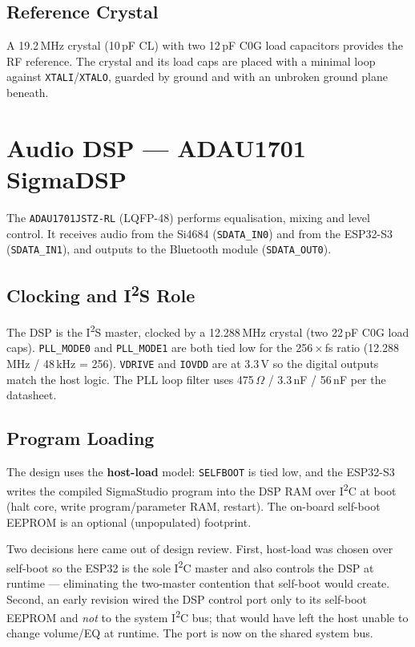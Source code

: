 \documentclass[11pt,a4paper]{report}
\newcommand{\ic}[1]{\texttt{#1}}
\begin{document}
\subsection{Reference Crystal}
A 19.2\,MHz crystal (10\,pF CL) with two 12\,pF C0G load capacitors provides the RF
reference. The crystal and its load caps are placed with a minimal loop against
\ic{XTALI}/\ic{XTALO}, guarded by ground and with an unbroken ground plane beneath.

\section{Audio DSP --- ADAU1701 SigmaDSP}
The \ic{ADAU1701JSTZ-RL} (LQFP-48) performs equalisation, mixing and level control.
It receives audio from the Si4684 (\ic{SDATA\_IN0}) and from the ESP32-S3
(\ic{SDATA\_IN1}), and outputs to the Bluetooth module (\ic{SDATA\_OUT0}).

\subsection{Clocking and I\textsuperscript{2}S Role}
The DSP is the I\textsuperscript{2}S master, clocked by a 12.288\,MHz crystal (two
22\,pF C0G load caps). \ic{PLL\_MODE0} and \ic{PLL\_MODE1} are both tied low for the
256\,$\times$\,fs ratio (12.288\,MHz / 48\,kHz = 256). \ic{VDRIVE} and \ic{IOVDD} are
at 3.3\,V so the digital outputs match the host logic. The PLL loop filter uses
475\,$\Omega$ / 3.3\,nF / 56\,nF per the datasheet.

\subsection{Program Loading}
The design uses the \textbf{host-load} model: \ic{SELFBOOT} is tied low, and the
ESP32-S3 writes the compiled SigmaStudio program into the DSP RAM over
I\textsuperscript{2}C at boot (halt core, write program/parameter RAM, restart). The
on-board self-boot EEPROM is an optional (unpopulated) footprint.

\begin{designbox}
Two decisions here came out of design review. First, host-load was chosen over
self-boot so the ESP32 is the sole I\textsuperscript{2}C master and also controls the
DSP at runtime --- eliminating the two-master contention that self-boot would create.
Second, an early revision wired the DSP control port only to its self-boot EEPROM and
\emph{not} to the system I\textsuperscript{2}C bus; that would have left the host
unable to change volume/EQ at runtime. The port is now on the shared system bus.
\end{designbox}
\end{document}

